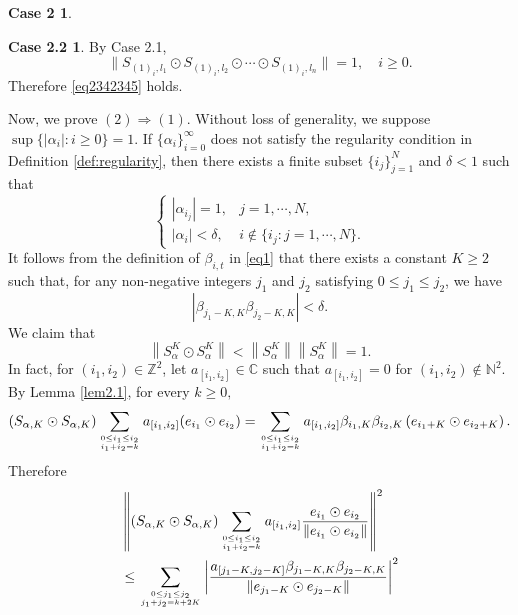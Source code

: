 \documentclass[11pt]{article}
\theoremstyle{plain}
\theoremstyle{definition}
\newtheorem*{case2}{Case 2}
\newtheorem*{case2.2}{Case 2.2}
\begin{document}
{\begin{case2}
\begin{case2.2}
By Case 2.1, \begin{equation}\label{eq2342341}\|S_{(1)_i,{l_{1}}}\odot S_{(1)_i,{l_{2}}}\odot \cdots \odot S_{(1)_i,{l_{n}}}\|=1, \quad  i\geq0.\end{equation}
Therefore  \eqref{eq2342345} holds.
\end{case2.2}
	\end{case2}
Now, we prove	$(2)\Rightarrow(1)$.
Without loss of generality, we suppose $\sup\{|\alpha_i| : i \geq 0\}=1.$
If $\{\alpha_{i}\}_{i=0}^{\infty}$ does not satisfy the regularity condition in Definition \ref{def:regularity}, 
then there exists a finite subset $\{i_j\}_{j=1}^N$ and $\delta < 1$ such that
$$
\begin{cases} 
|\alpha_{i_j}|=1, & j=1,\cdots,N, \\ 
|\alpha_i|< \delta, & i\not\in\{i_j: j=1,\cdots,N \}.
\end{cases}$$
It follows from the definition of $\beta_{i, t}$ in \eqref{eq1} that there exists a constant $K\geq 2$ such that, for any non-negative integers $j_1$
  and $j_2$
  satisfying $0 \leq j_1\leq j_2$,
  we have $$|\beta_{j_1 - K, K} \beta_{j_2 - K, K}| < \delta.$$
 We claim that
\begin{equation}\label{eq2.34}
\left \|  S_{\alpha}^K\odot S_{\alpha}^K\right \| <  \left \|   S_{\alpha}^K\right \|\left \| S_{\alpha}^K\right \|=1.
\end{equation}
In fact, for $(i_1,i_2) \in \mathbb{Z}^2$, let $a_{[i_1, i_2] } \in \mathbb{C}$
such that $a_{[i_1, i_2]} = 0$ for $(i_1, i_2) \notin \mathbb{N}^2$. By Lemma \ref{lem2.1}, for every $ k \geq 0,$
	\begin{equation*}
				\left( S_{\alpha,{K}}\odot S_{\alpha,{K}}\right)
			\sum_{0 \leq i_1 \leq  i_2 \atop i_1 +  i_2 = k}a_{[i_1 , i_2]} {\left(  e_{i_{1} }\odot e_{i_{2} } \right) }
=\sum_{0 \leq i_1 \leq  i_2 \atop i_1 +  i_2 = k}a_{[i_1 , i_2]}\beta_{i_{1},K} \beta_{i_{2},K} \left (  e_{i_{1}+K }\odot e_{i_{2}+K } \right ).
\end{equation*}
Therefore 
\begin{equation}\label{eq2.36}
			\begin{aligned}
	&	\left\|\left( S_{\alpha,{K}}\odot S_{\alpha,{K}}\right)
			\sum_{0 \leq i_1 \leq  i_2 \atop i_1 +  i_2 = k}a_{[i_1 , i_2]}\frac{ e_{i_{1} }\odot e_{i_{2} } }{\left \|  e_{i_{1} }\odot e_{i_{2} } \right \| }\right\|^2
\\&\leq \sum\limits_{0 \leq j_1 \leq  j_2 \atop j_1 +  j_2 = k+2K   }
		  \left| \frac{a_{[j_1 -K,j_2-K] }	\beta_{j_1 -K,K} \beta_{j_2-K,K}}{\left \|  e_{j_1 -K }\odot e_{j_2-K}  \right \|}  \right|^2

\end{aligned}
\end{equation}}
\end{document}
